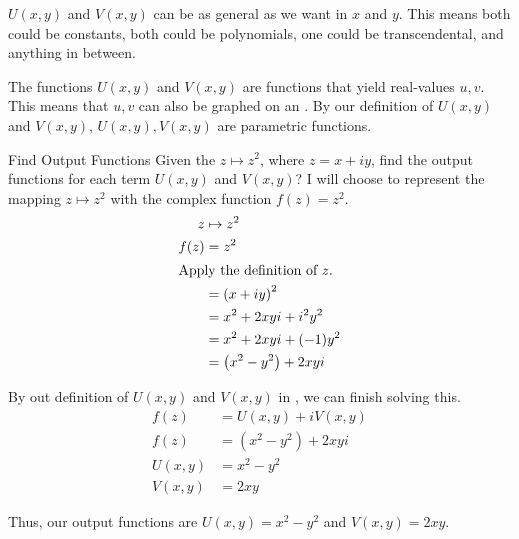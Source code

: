 $U(x, y)$ and $V(x, y)$ can be as general as we want in $x$ and $y$.
This means both could be constants, both could be polynomials, one could be transcendental, and anything in between.

The functions $U(x, y)$ and $V(x, y)$ are functions that yield real-values $u, v$.
This means that $u, v$ can also be graphed on an .
By our definition of $U(x, y)$ and $V(x, y)$, $U(x, y), V(x, y)$ are parametric functions.

\begin{example}[Lecture 4]{Find Output Functions}
  Given the  $z \mapsto z^{2}$, where $z = x + iy$, find the output functions for each term $U(x, y)$ and $V(x, y)$?
  \tcblower{}
  I will choose to represent the mapping $z \mapsto z^{2}$ with the complex function $f(z) = z^{2}$.
  \begin{align*}
    z &\mapsto z^{2} \\
    f(z) &= z^{2} \\
    \shortintertext{Apply the definition of $z$.}
      &= {(x + iy)}^{2} \\
      &= x^{2} + 2xyi + i^{2}y^{2} \\
      &= x^{2} + 2xyi + (-1)y^{2} \\
      &= \left( x^{2} - y^{2} \right) + 2xyi \\
  \end{align*}

  By out definition of $U(x, y)$ and $V(x, y)$ in , we can finish solving this.
  \begin{align*}
    f(z) &= U(x, y) + iV(x, y) \\
    f(z) &= \left( x^{2} - y^{2} \right) + 2xyi \\
    U(x, y) &= x^{2} - y^{2} \\
    V(x, y) &= 2xy
  \end{align*}

  Thus, our output functions are $U(x, y) = x^{2} - y^{2}$ and $V(x, y) = 2xy$.
\end{example}













